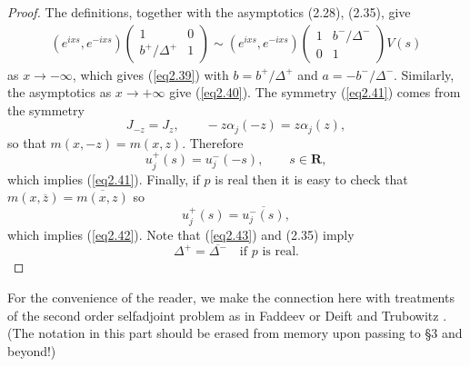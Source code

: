 \documentclass{surv-l}
\theoremstyle{plain}
\theoremstyle{definition}
\numberwithin{equation}{chapter}
\begin{document}
\begin{proof}
The definitions, together with the asymptotics (2.28), (2.35), give
\begin{align*}
(e^{ixs}, e^{-ixs}) \left(\begin{array}{cc}
1 & 0\\
b^{+}/\Delta^{+} & 1
\end{array}\right)\sim(e^{ixs}, e^{-ixs}) \left(\begin{array}{cc}
1 & b^{-}/\Delta^{-}\\
0 & 1
\end{array}\right) V(s)
\end{align*}
as $ x\rightarrow-\infty$, which gives (\ref{eq2.39}) with $b=b^{+}/\Delta^{+}$ and $a=-b^{-}/\Delta^{-}$. Similarly, the asymptotics as $ x\rightarrow+\infty$ give (\ref{eq2.40}). The symmetry (\ref{eq2.41}) comes from the symmetry
\begin{equation*}
J_{-z}=J_{z},\qquad -z\alpha_{j}(-z)=z\alpha_{j}(z),
\end{equation*}
so that $m(x, -z)=m(x, z)$. Therefore
\begin{equation*}
u_{j}^{+}(s)=u_{j}^{-}(-s),\qquad s\in \mathbf{R},
\end{equation*}
which implies (\ref{eq2.41}). Finally, if $p$ is real then it is easy to check that $m(x, \overline{z})= \overline{m(x,z)}$ so
\begin{equation}\label{eq2.43}
u_{j}^{+}(s)=\overline{u_{j}^{-}(s)},
\end{equation}
which implies (\ref{eq2.42}). Note that (\ref{eq2.43}) and (2.35) imply
\begin{equation}\label{eq2.44}
\Delta^{+}=\overline{{\Delta^{-}}}\quad\text{if }p\text{ is  real}.
\end{equation}
\end{proof}
For the convenience of the reader, we make the connection here with treatments of the second order selfadjoint problem as in Faddeev \cite{Fa1} or Deift and Trubowitz \cite{DT}. (The notation in this part should be erased from memory upon passing to \S 3 and beyond!)
\end{document}
